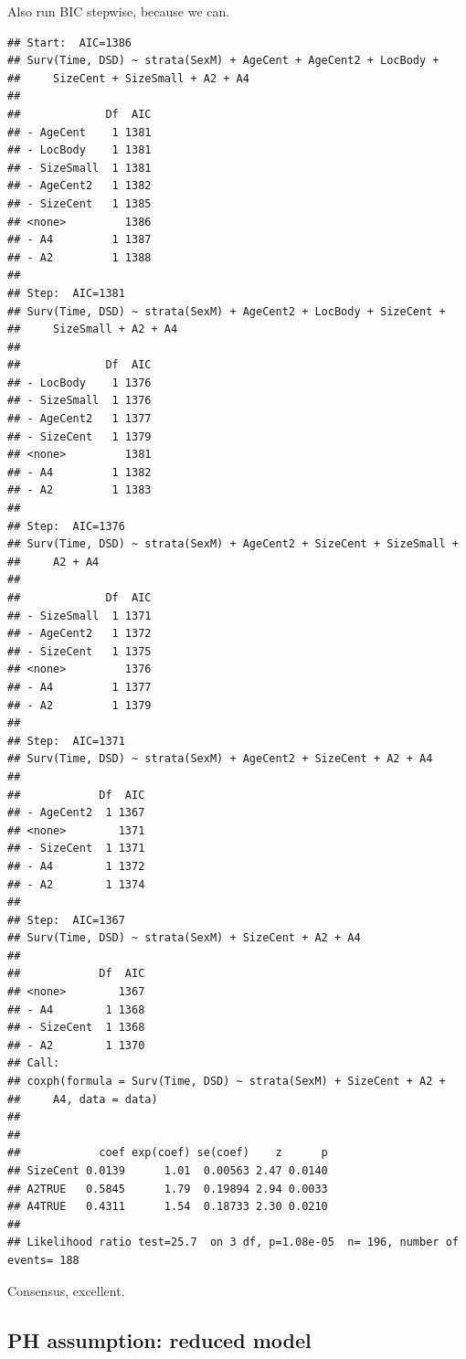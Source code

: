 \documentclass{article}
\begin{document}
Also run BIC stepwise, because we can.
\begin{knitrout}
\color{fgcolor}\begin{kframe}
\begin{alltt}
  \hlstd{=} \hlstd{(}
\end{alltt}
\begin{verbatim}
## Start:  AIC=1386
## Surv(Time, DSD) ~ strata(SexM) + AgeCent + AgeCent2 + LocBody + 
##     SizeCent + SizeSmall + A2 + A4
## 
##             Df  AIC
## - AgeCent    1 1381
## - LocBody    1 1381
## - SizeSmall  1 1381
## - AgeCent2   1 1382
## - SizeCent   1 1385
## <none>         1386
## - A4         1 1387
## - A2         1 1388
## 
## Step:  AIC=1381
## Surv(Time, DSD) ~ strata(SexM) + AgeCent2 + LocBody + SizeCent + 
##     SizeSmall + A2 + A4
## 
##             Df  AIC
## - LocBody    1 1376
## - SizeSmall  1 1376
## - AgeCent2   1 1377
## - SizeCent   1 1379
## <none>         1381
## - A4         1 1382
## - A2         1 1383
## 
## Step:  AIC=1376
## Surv(Time, DSD) ~ strata(SexM) + AgeCent2 + SizeCent + SizeSmall + 
##     A2 + A4
## 
##             Df  AIC
## - SizeSmall  1 1371
## - AgeCent2   1 1372
## - SizeCent   1 1375
## <none>         1376
## - A4         1 1377
## - A2         1 1379
## 
## Step:  AIC=1371
## Surv(Time, DSD) ~ strata(SexM) + AgeCent2 + SizeCent + A2 + A4
## 
##            Df  AIC
## - AgeCent2  1 1367
## <none>        1371
## - SizeCent  1 1371
## - A4        1 1372
## - A2        1 1374
## 
## Step:  AIC=1367
## Surv(Time, DSD) ~ strata(SexM) + SizeCent + A2 + A4
## 
##            Df  AIC
## <none>        1367
## - A4        1 1368
## - SizeCent  1 1368
## - A2        1 1370
## Call:
## coxph(formula = Surv(Time, DSD) ~ strata(SexM) + SizeCent + A2 + 
##     A4, data = data)
## 
## 
##            coef exp(coef) se(coef)    z      p
## SizeCent 0.0139      1.01  0.00563 2.47 0.0140
## A2TRUE   0.5845      1.79  0.19894 2.94 0.0033
## A4TRUE   0.4311      1.54  0.18733 2.30 0.0210
## 
## Likelihood ratio test=25.7  on 3 df, p=1.08e-05  n= 196, number of events= 188
\end{verbatim}
\end{kframe}
\end{knitrout}
Consensus, excellent.


\subsection{PH assumption: reduced model}
\end{document}
